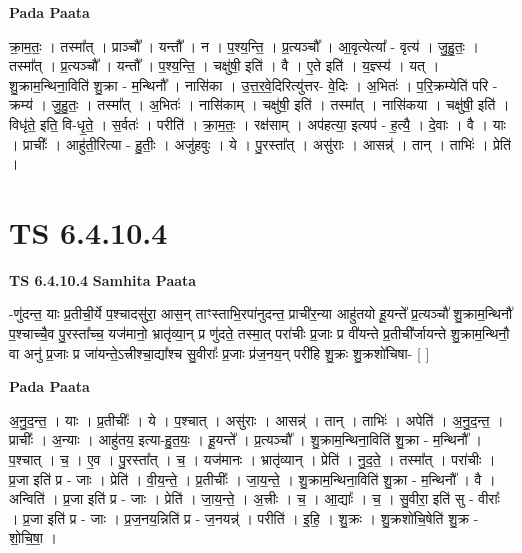 \documentclass[17pt]{extarticle}
\begin{document}
\textbf{Pada Paata} \newline

क्रा॒म॒तः॒ । तस्मा᳚त् । प्राञ्चौ᳚ । यन्तौ᳚ । न । प॒श्य॒न्ति॒ । प्र॒त्यञ्चौ᳚ । आ॒वृत्येत्या᳚ - वृत्य॑ । जु॒हु॒तः॒ । तस्मा᳚त् । प्र॒त्यञ्चौ᳚ । यन्तौ᳚ । प॒श्य॒न्ति॒ । चक्षु॑षी॒ इति॑ । वै । ए॒ते इति॑ । य॒ज्ञ्स्य॑ । यत् । शु॒क्राम॒न्थिना॒विति॑ शु॒क्रा - म॒न्थिनौ᳚ । नासि॑का । उ॒त्त॒र॒वे॒दिरित्यु॑त्तर- वे॒दिः । अ॒भितः॑ । प॒रि॒क्रम्येति॑ परि - क्रम्य॑ । जु॒हु॒तः॒ । तस्मा᳚त् । अ॒भितः॑ । नासि॑काम् । चक्षु॑षी॒ इति॑ । तस्मा᳚त् । नासि॑कया । चक्षु॑षी॒ इति॑ । विधृ॑ते॒ इति॒ वि-धृ॒ते॒ । स॒र्वतः॑ । परीति॑ । क्रा॒म॒तः॒ । रक्ष॑साम् । अप॑हत्या॒ इत्यप॑ - ह॒त्यै॒ । दे॒वाः । वै । याः । प्राचीः᳚ । आहु॑ती॒रित्या - हु॒तीः॒ । अजु॑हवुः । ये । पु॒रस्ता᳚त् । असु॑राः । आसन्न्॑ । तान् । ताभिः॑ । प्रेति॑ ।  \newline




\section*{ TS 6.4.10.4 }

\textbf{TS 6.4.10.4 } \newline
\textbf{Samhita Paata} \newline

-णु॑दन्त॒ याः प्र॒तीची॒र्ये प॒श्चादसु॑रा॒ आस॒न् ताꣳस्ताभि॒रपा॑नुदन्त॒ प्राची॑र॒न्या आहु॑तयो हू॒यन्ते᳚ प्र॒त्यञ्चौ॑ शु॒क्राम॒न्थिनौ॑ प॒श्चाच्चै॒व पु॒रस्ता᳚च्च॒ यज॑मानो॒ भ्रातृ॑व्या॒न् प्र णु॑दते॒ तस्मा॒त् परा॑चीः प्र॒जाः प्र वी॑यन्ते प्र॒तीची᳚र्जायन्ते शु॒क्राम॒न्थिनौ॒ वा अनु॑ प्र॒जाः प्र जा॑यन्ते॒ऽत्त्रीश्चा॒द्या᳚श्च सु॒वीराः᳚ प्र॒जाः प्र॑ज॒नय॒न् परी॑हि शु॒क्रः शु॒क्रशो॑चिषा- [  ] \newline

\textbf{Pada Paata} \newline

अ॒नु॒द॒न्त॒ । याः । प्र॒तीचीः᳚ । ये । प॒श्चात् । असु॑राः । आसन्न्॑ । तान् । ताभिः॑ । अपेति॑ । अ॒नु॒द॒न्त॒ । प्राचीः᳚ । अ॒न्याः । आहु॑तय॒ इत्या-हु॒त॒यः॒ । हू॒यन्ते᳚ । प्र॒त्यञ्चौ᳚ । शु॒क्राम॒न्थिना॒विति॑ शु॒क्रा - म॒न्थिनौ᳚ । प॒श्चात् । च॒ । ए॒व । पु॒रस्ता᳚त् । च॒ । यज॑मानः । भ्रातृ॑व्यान् । प्रेति॑ । नु॒द॒ते॒ । तस्मा᳚त् । परा॑चीः । प्र॒जा इति॑ प्र - जाः । प्रेति॑ । वी॒य॒न्ते॒ । प्र॒तीचीः᳚ । जा॒य॒न्ते॒ । शु॒क्राम॒न्थिना॒विति॑ शु॒क्रा - म॒न्थिनौ᳚ । वै । अन्विति॑ । प्र॒जा इति॑ प्र - जाः । प्रेति॑ । जा॒य॒न्ते॒ । अ॒त्त्रीः । च॒ । आ॒द्याः᳚ । च॒ । सु॒वीरा॒ इति॑ सु - वीराः᳚ । प्र॒जा इति॑ प्र - जाः । प्र॒ज॒नय॒न्निति॑ प्र - ज॒नयन्न्॑ । परीति॑ । इ॒हि॒ । शु॒क्रः । शु॒क्रशो॑चि॒षेति॑ शु॒क्र - शो॒चि॒षा॒ ।  \newline
\end{document}

